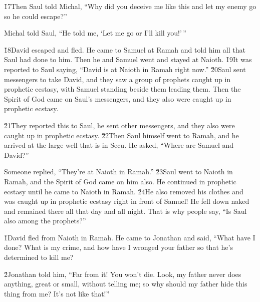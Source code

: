 \v{17}Then Saul told Michal, ``Why did you deceive me like this and let my enemy go so he could escape?''

Michal told Saul, ``He told me, `Let me go or I'll kill you!'\,''

\v{18}David escaped and fled. He came to Samuel at Ramah and told him all that Saul had done to him. Then he and Samuel went and stayed at Naioth. \v{19}It was reported to Saul saying, ``David is at Naioth in Ramah right now.'' \v{20}Saul sent messengers to take David, and they saw a group of prophets caught up in prophetic ecstasy, with Samuel standing beside them leading them. Then the Spirit of God came on Saul's messengers, and they also were caught up in prophetic ecstasy.

\v{21}They reported this to Saul, he sent other messengers, and they also were caught up in prophetic ecstasy. \v{22}Then Saul himself went to Ramah, and he arrived at the large well that is in Secu. He asked, ``Where are Samuel and David?''

Someone replied, ``They're at Naioth in Ramah.'' \v{23}Saul went to Naioth in Ramah, and the Spirit of God came on him also. He continued in prophetic ecstasy until he came to Naioth in Ramah. \v{24}He also removed his clothes and was caught up in prophetic ecstasy right in front of Samuel! He fell down naked and remained there all that day and all night. That is why people say, ``Is Saul also among the prophets?''

\v{1}David fled from Naioth in Ramah. He came to Jonathan and said, ``What have I done? What is my crime, and how have I wronged your father so that he's determined to kill me?

\v{2}Jonathan told him, ``Far from it! You won't die. Look, my father never does anything, great or small, without telling me; so why should my father hide this thing from me? It's not like that!''

